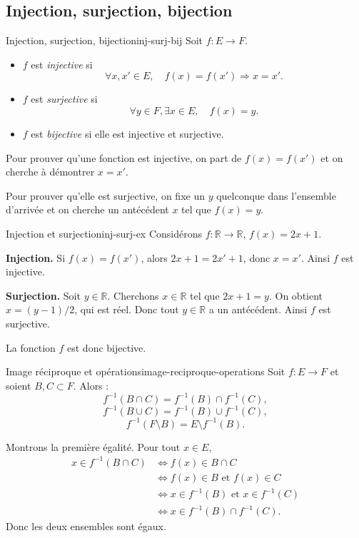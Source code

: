 \documentclass[11pt,a4paper]{article}
\newcommand{\R}{\mathbb{R}}
\begin{document}
\subsection{Injection, surjection, bijection}

\begin{definitionbox}{Injection, surjection, bijection}{inj-surj-bij}
Soit $f:E\to F$.
\begin{itemize}
  \item $f$ est \emph{injective} si
  \[
  \forall x,x'\in E,\quad f(x)=f(x')\Rightarrow x=x'.
  \]
  \item $f$ est \emph{surjective} si
  \[
  \forall y\in F,\exists x\in E,\quad f(x)=y.
  \]
  \item $f$ est \emph{bijective} si elle est injective et surjective.
\end{itemize}
\end{definitionbox}

\begin{methodebox}
Pour prouver qu'une fonction est injective, on part de $f(x)=f(x')$ et on cherche à démontrer $x=x'$.

Pour prouver qu'elle est surjective, on fixe un $y$ quelconque dans l'ensemble d'arrivée et on cherche un antécédent $x$ tel que $f(x)=y$.
\end{methodebox}

\begin{exemplebox}{Injection et surjection}{inj-surj-ex}
Considérons $f:\R\to\R$, $f(x)=2x+1$.

\textbf{Injection.} Si $f(x)=f(x')$, alors $2x+1=2x'+1$, donc $x=x'$. Ainsi $f$ est injective.

\textbf{Surjection.} Soit $y\in\R$. Cherchons $x\in\R$ tel que $2x+1=y$. On obtient $x=(y-1)/2$, qui est réel. Donc tout $y\in\R$ a un antécédent. Ainsi $f$ est surjective.

La fonction $f$ est donc bijective.
\end{exemplebox}

\begin{propositionbox}{Image réciproque et opérations}{image-reciproque-operations}
Soit $f:E\to F$ et soient $B,C\subset F$. Alors :
\[
f^{-1}(B\cap C)=f^{-1}(B)\cap f^{-1}(C),
\]
\[
f^{-1}(B\cup C)=f^{-1}(B)\cup f^{-1}(C),
\]
\[
f^{-1}(F\setminus B)=E\setminus f^{-1}(B).
\]
\end{propositionbox}

\begin{preuvebox}
Montrons la première égalité. Pour tout $x\in E$,
\begin{align*}
x\in f^{-1}(B\cap C)
&\Longleftrightarrow f(x)\in B\cap C\\
&\Longleftrightarrow f(x)\in B\text{ et }f(x)\in C\\
&\Longleftrightarrow x\in f^{-1}(B)\text{ et }x\in f^{-1}(C)\\
&\Longleftrightarrow x\in f^{-1}(B)\cap f^{-1}(C).
\end{align*}
Donc les deux ensembles sont égaux.
\end{preuvebox}
\end{document}
